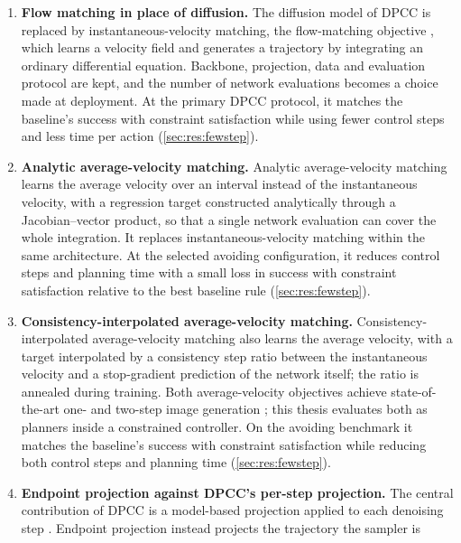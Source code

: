 \begin{enumerate}
  \item \textbf{Flow matching in place of diffusion.} The diffusion model of \ac{DPCC}
    \parencite{romer2025diffusion} is replaced by instantaneous-velocity matching, the flow-matching
    objective \parencite{lipman2023flow,lipman2024guide}, which learns a velocity field and generates a
    trajectory by integrating an ordinary differential equation. Backbone, projection, data and
    evaluation protocol are kept, and the number of network evaluations becomes a choice made at
    deployment.
    At the primary DPCC protocol, it matches the baseline's success with constraint satisfaction
    while using fewer control steps and less time per action (\autoref{sec:res:fewstep}).
  \item \textbf{Analytic average-velocity matching.} Analytic average-velocity matching
    \parencite{geng2025meanflow} learns the average velocity over an interval instead of the
    instantaneous velocity, with a regression target constructed analytically through a
    Jacobian--vector product, so that a single network evaluation can cover the whole integration. It
    replaces instantaneous-velocity matching within the same architecture.
    At the selected avoiding configuration, it reduces control steps and planning time with a small
    loss in success with constraint satisfaction relative to the best baseline rule
    (\autoref{sec:res:fewstep}).
  \item \textbf{Consistency-interpolated average-velocity matching.} Consistency-interpolated
    average-velocity matching \parencite{zhang2025alphaflow} also learns the average velocity, with a
    target interpolated by a consistency step ratio between the instantaneous velocity and a
    stop-gradient prediction of the network itself; the ratio is annealed during training. Both
    average-velocity objectives achieve state-of-the-art one- and two-step image generation
    \parencite{geng2025meanflow,zhang2025alphaflow}; this thesis evaluates both as planners inside a
    constrained controller.
    On the avoiding benchmark it matches the baseline's success with constraint satisfaction
    while reducing both control steps and planning time (\autoref{sec:res:fewstep}).
  \item \textbf{Endpoint projection against DPCC's per-step projection.} The central contribution of
    DPCC is a model-based projection applied to each denoising step \parencite{romer2025diffusion}.
    Endpoint projection \parencite{li2025hardflow} instead projects the trajectory the sampler is

\end{enumerate}
